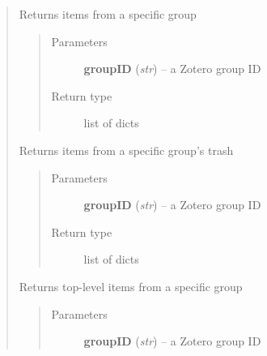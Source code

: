 \documentclass[letterpaper,10pt,english]{sphinxmanual}
\begin{document}
\begin{quote}
\begin{fulllineitems}
\begin{quote}
\begin{description}
\end{description}\end{quote}

\end{fulllineitems}


\begin{fulllineitems}
\label{index:pyzotero.zotero.Zotero.group_items}
Returns items from a specific group
\begin{quote}\begin{description}
\item[{Parameters}] \leavevmode
\textbf{groupID} (\emph{str}) -- a Zotero group ID

\item[{Return type}] \leavevmode
list of dicts

\end{description}\end{quote}

\end{fulllineitems}


\begin{fulllineitems}
\label{index:pyzotero.zotero.Zotero.group_trash}
Returns items from a specific group's trash
\begin{quote}\begin{description}
\item[{Parameters}] \leavevmode
\textbf{groupID} (\emph{str}) -- a Zotero group ID

\item[{Return type}] \leavevmode
list of dicts

\end{description}\end{quote}

\end{fulllineitems}


\begin{fulllineitems}
\label{index:pyzotero.zotero.Zotero.group_top}
Returns top-level items from a specific group
\begin{quote}\begin{description}
\item[{Parameters}] \leavevmode
\textbf{groupID} (\emph{str}) -- a Zotero group ID


\end{description}
\end{quote}
\end{fulllineitems}
\end{quote}
\end{document}
